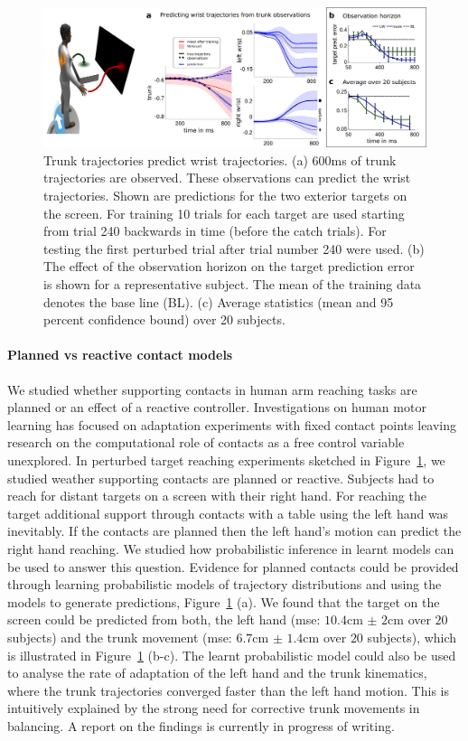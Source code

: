 \documentclass[final,5p,twocolumn]{elsarticle}
\begin{document}
\begin{figure}
\centering
\includegraphics[width=\linewidth]{images/SummaryFig_Y2Report.png}
\caption{Trunk trajectories predict wrist trajectories. (a) 600ms of trunk trajectories are observed. These observations can predict the wrist trajectories. Shown are predictions for the two exterior targets on the screen. For training 10 trials for each target are used starting from trial 240 backwards in time (before the catch trials). For testing the first perturbed trial after trial number 240 were used. (b) The effect of the observation horizon on the target prediction error is shown for a representative subject. The mean of the training data denotes the base line (BL). (c) Average statistics (mean and 95 percent confidence bound) over 20 subjects.
}
\label{fig:HumanProMPsPrediction}
\end{figure}

\paragraph{Planned vs reactive contact models} We studied whether supporting contacts in human arm reaching tasks are planned or an effect of a reactive controller. Investigations on human motor learning has focused on adaptation experiments with fixed contact points leaving research on the computational role of contacts as a free control variable unexplored. In perturbed target reaching experiments sketched in Figure~\ref{fig:HumanProMPsPrediction}, we studied weather supporting contacts are planned or reactive. Subjects had to reach for distant targets on a screen with their right hand. For reaching the target additional support through contacts with a table using the left hand was inevitably. If the contacts are planned then the left hand's motion can predict the right hand reaching. We studied how probabilistic inference in learnt models can be used to answer this question. Evidence for planned contacts could be provided through learning probabilistic models of trajectory distributions and using the models to generate predictions, Figure~\ref{fig:HumanProMPsPrediction} (a). We found that the target on the screen could be predicted from both, the left hand (mse: $10.4$cm $\pm$ $2$cm over $20$ subjects) and the trunk movement (mse: $6.7$cm $\pm$ $1.4$cm over $20$ subjects), which is illustrated in Figure~\ref{fig:HumanProMPsPrediction} (b-c). The learnt probabilistic model could also be used to analyse the rate of adaptation of the left hand and the trunk kinematics, where the trunk trajectories converged faster than the left hand motion. This is intuitively explained by the strong need for corrective trunk movements in balancing. A report on the findings is currently in progress of writing.
\end{document}
